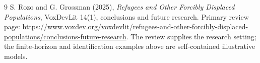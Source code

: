 \documentclass[11pt,a4paper]{article}
\begin{document}
\begin{thebibliography}{9}
 S. Rozo and G. Grossman (2025), \emph{Refugees and Other Forcibly Displaced Populations}, VoxDevLit 14(1), conclusions and future research. Primary review page: \url{https://www.voxdev.org/voxdevlit/refugees-and-other-forcibly-displaced-populations/conclusions-future-research}. The review supplies the research setting; the finite-horizon and identification examples above are self-contained illustrative models.
\end{thebibliography}
\end{document}

